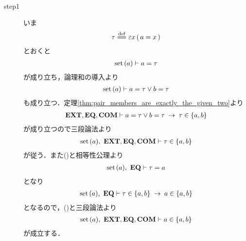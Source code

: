 	\begin{sketch}\mbox{}
		\begin{description}
			\item[step1]
				いま
				\begin{align}
					\tau \defeq \varepsilon x\, (\, a = x\, )
				\end{align}
				とおくと
				\begin{align}
					\operatorname*{set}\hspace{0.15em}(a) \vdash a = \tau
					\label{fom:set_is_an_element_of_its_pair_1}
				\end{align}
				が成り立ち，論理和の導入より
				\begin{align}
					\operatorname*{set}\hspace{0.15em}(a) \vdash a = \tau \vee b = \tau
				\end{align}
				も成り立つ．定理\ref{thm:pair_members_are_exactly_the_given_two}より
				\begin{align}
					\mbox{{\bf EXT}},\mbox{{\bf EQ}},\mbox{\bf COM} \vdash 
					a = \tau \vee b = \tau \hspace{0.25em}\rightarrow\hspace{0.25em} \tau \in \{a,b\}
				\end{align}
				が成り立つので三段論法より
				\begin{align}
					\operatorname*{set}\hspace{0.15em}(a),\ \mbox{{\bf EXT}},\mbox{{\bf EQ}},\mbox{\bf COM} \vdash \tau \in \{a,b\}
					\label{fom:set_is_an_element_of_its_pair_2}
				\end{align}
				が従う．また()と相等性公理より
				\begin{align}
					\operatorname*{set}\hspace{0.15em}(a),\ \mbox{{\bf EQ}} \vdash \tau = a
				\end{align}
				となり
				\begin{align}
					\operatorname*{set}\hspace{0.15em}(a),\ \mbox{{\bf EQ}} \vdash \tau \in \{a,b\} \hspace{0.25em}\rightarrow\hspace{0.25em} a \in \{a,b\}
				\end{align}
				となるので，()と三段論法より
				\begin{align}
					\operatorname*{set}\hspace{0.15em}(a),\ \mbox{{\bf EXT}},\mbox{{\bf EQ}},\mbox{\bf COM} \vdash a \in \{a,b\}
				\end{align}
				が成立する．
			

\end{description}
\end{sketch}
